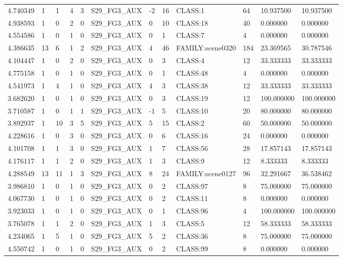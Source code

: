 \begin{tabular}{llllllllllll}
4.740349 & 1 & 1 & 4 & 3 & S29\_FG3\_AUX & -2 & 16 & CLASS:1 & 64 & 10.937500 & 10.937500 \\
4.938593 & 1 & 0 & 2 & 0 & S29\_FG3\_AUX & 0 & 10 & CLASS:18 & 40 & 0.000000 & 0.000000 \\
4.554586 & 1 & 0 & 1 & 0 & S29\_FG3\_AUX & 0 & 1 & CLASS:7 & 4 & 0.000000 & 0.000000 \\
4.386635 & 13 & 6 & 1 & 2 & S29\_FG3\_AUX & 4 & 46 & FAMILY:scene0320 & 184 & 23.369565 & 30.787546 \\
4.104447 & 1 & 0 & 2 & 0 & S29\_FG3\_AUX & 0 & 3 & CLASS:4 & 12 & 33.333333 & 33.333333 \\
4.775158 & 1 & 0 & 1 & 0 & S29\_FG3\_AUX & 0 & 1 & CLASS:48 & 4 & 0.000000 & 0.000000 \\
4.541973 & 1 & 4 & 1 & 0 & S29\_FG3\_AUX & 4 & 3 & CLASS:38 & 12 & 33.333333 & 33.333333 \\
3.682620 & 1 & 0 & 1 & 0 & S29\_FG3\_AUX & 0 & 3 & CLASS:19 & 12 & 100.000000 & 100.000000 \\
3.710587 & 1 & 0 & 1 & 1 & S29\_FG3\_AUX & -1 & 5 & CLASS:10 & 20 & 80.000000 & 80.000000 \\
3.892937 & 1 & 10 & 3 & 5 & S29\_FG3\_AUX & 5 & 15 & CLASS:2 & 60 & 50.000000 & 50.000000 \\
4.228616 & 1 & 0 & 3 & 0 & S29\_FG3\_AUX & 0 & 6 & CLASS:16 & 24 & 0.000000 & 0.000000 \\
4.101708 & 1 & 1 & 3 & 0 & S29\_FG3\_AUX & 1 & 7 & CLASS:56 & 28 & 17.857143 & 17.857143 \\
4.176117 & 1 & 1 & 2 & 0 & S29\_FG3\_AUX & 1 & 3 & CLASS:9 & 12 & 8.333333 & 8.333333 \\
4.288549 & 13 & 11 & 1 & 3 & S29\_FG3\_AUX & 8 & 24 & FAMILY:scene0127 & 96 & 32.291667 & 36.538462 \\
3.986810 & 1 & 0 & 1 & 0 & S29\_FG3\_AUX & 0 & 2 & CLASS:97 & 8 & 75.000000 & 75.000000 \\
4.067730 & 1 & 0 & 1 & 0 & S29\_FG3\_AUX & 0 & 2 & CLASS:11 & 8 & 0.000000 & 0.000000 \\
3.923033 & 1 & 0 & 1 & 0 & S29\_FG3\_AUX & 0 & 1 & CLASS:96 & 4 & 100.000000 & 100.000000 \\
3.765078 & 1 & 1 & 2 & 0 & S29\_FG3\_AUX & 1 & 3 & CLASS:5 & 12 & 58.333333 & 58.333333 \\
4.234065 & 1 & 5 & 1 & 0 & S29\_FG3\_AUX & 5 & 2 & CLASS:36 & 8 & 75.000000 & 75.000000 \\
4.550742 & 1 & 0 & 1 & 0 & S29\_FG3\_AUX & 0 & 2 & CLASS:99 & 8 & 0.000000 & 0.000000 \\

\end{tabular}
